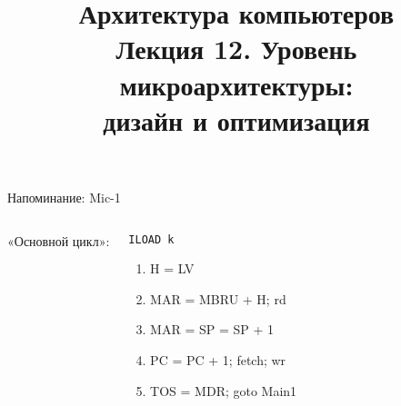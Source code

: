 \newcommand{\h}{%
handout,%
}




\title[Уровень микроархитектуры (2)]{Архитектура компьютеров\texorpdfstring{\\}{ }Лекция 12. Уровень микроархитектуры:\texorpdfstring{\\}{ }
дизайн и оптимизация}



\begin{frame}
\titlepage
\end{frame}



\begin{frame}{Напоминание: Mic-1}
    \ttfamily\small


\begin{columns}
        \column{4cm}
\vspace{-.5cm}

        \column{7.5cm}
\pause
«Основной цикл»:\\
{\footnotesize {}}
    \pause
    \begin{block}{\texttt{ILOAD k}}
    \pause
    \begin{enumerate}[<+->]
        \item H = LV
        \item MAR = MBRU + H; rd
        \item MAR = SP = SP + 1
        \item PC = PC + 1; fetch; wr
        \item TOS = MDR; goto Main1
    \end{enumerate}
    \end{block}

\end{columns}
\end{frame}


